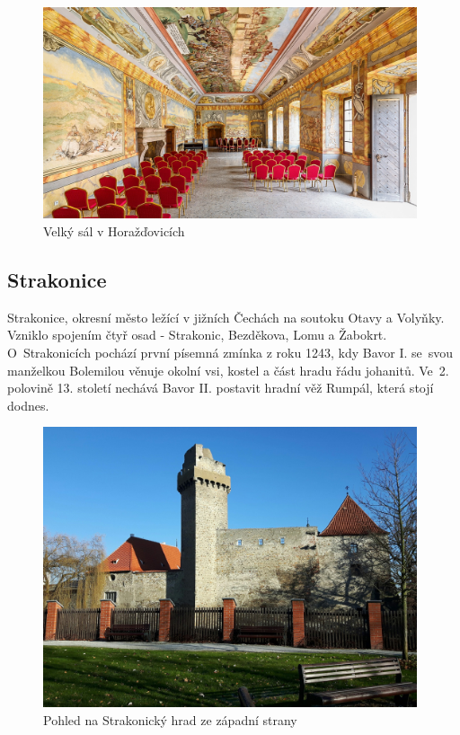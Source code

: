 \documentclass[thesis=M,czech]{FITthesis}[2012/06/26]
\begin{document}
\begin{figure}[h!]
	\centering
	\includegraphics[width=11cm]{pics/hd.jpg}
	\caption{Velký sál v Horažďovicích}
	\label{obrazek:hd}
\end{figure}



\subsection{Strakonice}
Strakonice, okresní město ležící v jižních Čechách na soutoku Otavy a Volyňky. Vzniklo spojením čtyř osad - Strakonic, Bezděkova, Lomu a Žabokrt. O~Strakonicích pochází první písemná zmínka z roku 1243, kdy Bavor I. se~svou manželkou Bolemilou věnuje okolní vsi, kostel a část hradu řádu johanitů. Ve~2. polovině 13. století nechává Bavor II. postavit hradní věž Rumpál, která stojí dodnes. 

\begin{figure}[h!]
	\centering
	\includegraphics[width=11cm]{pics/hrad.jpg}
	\caption{Pohled na Strakonický hrad ze západní strany}
	\label{obrazek:hrad}
\end{figure}
\end{document}
